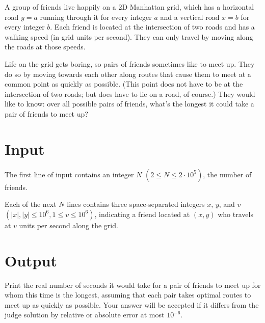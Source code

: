 
\newcommand{\cmaxn}{2 \cdot 10^{5}}
\newcommand{\cmaxx}{10^{6}}

A group of friends live happily on a 2D Manhattan grid, which has a horizontal road $y=a$ running through it for every integer $a$ and a vertical road $x=b$ for every integer $b$. Each friend is located at the intersection of two roads and has a walking speed (in grid units per second). They can only travel by moving along the roads at those speeds.

Life on the grid gets boring, so pairs of friends sometimes like to meet up. They do so by moving towards each other along routes that cause them to meet at a common point as quickly as possible. (This point does not have to be at the intersection of two roads; but does have to lie on a road, of course.) They would like to know: over all possible pairs of friends, what's the longest it could take a pair of friends to meet up?

\section*{Input}
The first line of input contains an integer $N$ $(2 \leq N \leq \cmaxn)$, the number of friends.

Each of the next $N$ lines contains three space-separated integers $x$, $y$, and $v$ $(|x|, |y| \leq \cmaxx, 1 \leq v \leq \cmaxx)$, indicating a friend located at $(x,y)$ who travels at $v$ units per second along the grid.
 
\section*{Output}
Print the real number of seconds it would take for a pair of friends to meet up for whom this time is the longest, assuming that each pair takes optimal routes to meet up as quickly as possible. Your answer will be accepted if it differs from the judge solution by relative or absolute error at most $10^{-6}$.
